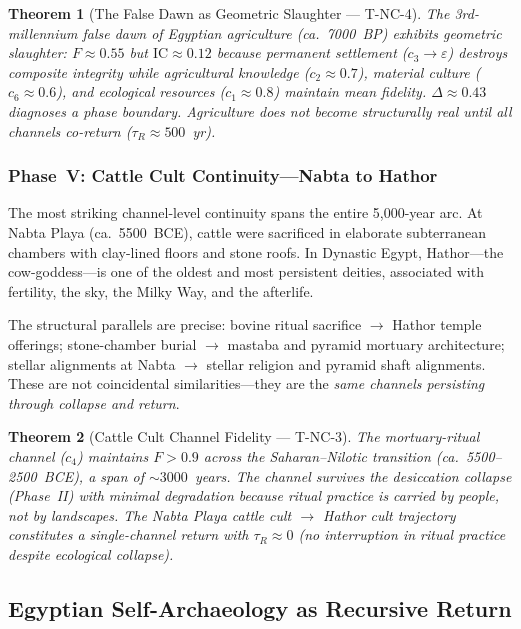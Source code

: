 \documentclass[
  aps,
  prd,
  twocolumn,
  superscriptaddress,
  nofootinbib,
  floatfix
]{revtex4-2}
\newtheorem{theorem}{Theorem}
\newcommand{\tR}{\tau_{\!R}}
\newcommand{\eps}{\varepsilon}
\newcommand{\IC}{\mathrm{IC}}
\begin{document}
\begin{theorem}[The False Dawn as Geometric
Slaughter --- T-NC-4]\label{thm:falsedawn}
The 3rd-millennium false dawn of Egyptian agriculture
(ca.\ 7000~BP) exhibits geometric slaughter:
$F \approx 0.55$ but $\IC \approx 0.12$ because
permanent settlement ($c_3 \to \eps$) destroys
composite integrity while agricultural knowledge
($c_2 \approx 0.7$), material culture ($c_6 \approx
0.6$), and ecological resources ($c_1 \approx 0.8$)
maintain mean fidelity.  $\Delta \approx 0.43$
diagnoses a phase boundary.  Agriculture does not
become structurally real until all channels co-return
($\tR \approx 500$~yr).
\end{theorem}


\subsubsection{Phase~V: Cattle Cult Continuity---Nabta
to Hathor}\label{sec:hathor}

The most striking channel-level continuity spans the
entire 5,000-year arc.  At Nabta Playa (ca.\ 5500~BCE),
cattle were sacrificed in elaborate subterranean
chambers with clay-lined floors and stone roofs.  In
Dynastic Egypt, Hathor---the cow-goddess---is one of
the oldest and most persistent deities, associated
with fertility, the sky, the Milky Way, and the
afterlife.

The structural parallels are precise: bovine ritual
sacrifice $\to$ Hathor temple offerings; stone-chamber
burial $\to$ mastaba and pyramid mortuary architecture;
stellar alignments at Nabta $\to$ stellar religion and
pyramid shaft alignments.  These are not coincidental
similarities---they are the \emph{same channels
persisting through collapse and return}.

\begin{theorem}[Cattle Cult Channel Fidelity ---
T-NC-3]\label{thm:hathor}
The mortuary-ritual channel ($c_4$) maintains
$F > 0.9$ across the Saharan--Nilotic transition
(ca.\ 5500--2500~BCE), a span of $\sim\!3000$~years.
The channel survives the desiccation collapse
(Phase~II) with minimal degradation because ritual
practice is carried by people, not by landscapes.
The Nabta Playa cattle cult $\to$ Hathor cult
trajectory constitutes a single-channel return with
$\tR \approx 0$ (no interruption in ritual practice
despite ecological collapse).
\end{theorem}


\subsection{Egyptian Self-Archaeology as Recursive
Return}\label{sec:selfarch}
\end{document}

